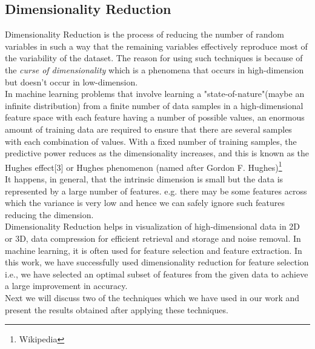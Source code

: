 \documentclass[11pt,a4paper]{article}
\begin{document}
\subsection{Dimensionality Reduction}
\label{sec:dimensionality_reduction}
Dimensionality Reduction is the process of reducing the number of random variables in such a way that the remaining variables effectively reproduce most of the variability of the dataset.
The reason for using such techniques is because of the \emph{curse of dimensionality} which is a phenomena that occurs in high-dimension but doesn't occur in low-dimension.\\
In machine learning problems that involve learning a "state-of-nature"(maybe an infinite distribution) from a finite number of data samples in a high-dimensional feature space with each feature having a number of possible values, an enormous amount of training data are required to ensure that there are several samples with each combination of values. With a fixed number of training samples, the predictive power reduces as the dimensionality increases, and this is known as the Hughes effect[3] or Hughes phenomenon (named after Gordon F. Hughes)\footnote{Wikipedia}\\
It happens, in general, that the intrinsic dimension is small but the data is represented by a large number of features. e.g. there may be some features across which the variance is very low and hence we can safely ignore such features reducing the dimension.\\
Dimensionality Reduction helps in visualization of high-dimensional data in 2D or 3D, data compression for efficient retrieval and storage and noise removal.
In machine learning, it is often used for feature selection and feature extraction. In this work, we have successfully used dimensionality reduction for feature selection i.e., we have selected an optimal subset of features from the given data to achieve a large improvement in accuracy.\\
Next we will discuss two of the techniques which we have used in our work and present the results obtained after applying these techniques.
\end{document}
